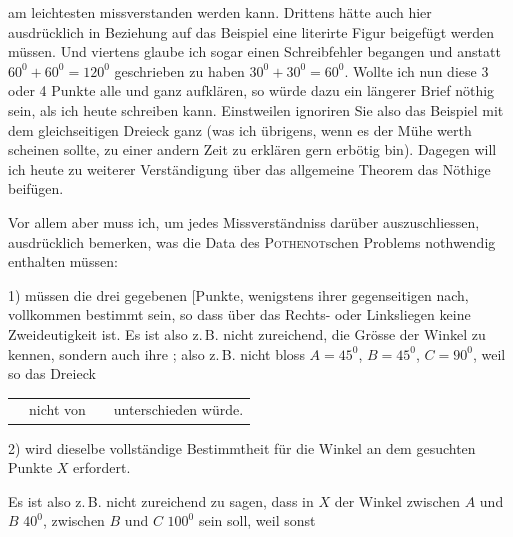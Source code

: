 am leichtesten missverstanden werden kann. Drittens hätte auch hier ausdrücklich
in Beziehung auf das Beispiel eine literirte Figur beigefügt werden müssen. Und
viertens glaube ich sogar einen Schreibfehler begangen und anstatt
$60^0+60^0=120^0$ geschrieben zu haben $30^0+30^0=60^0$. Wollte ich nun diese
3 oder 4 Punkte alle und ganz aufklären, so würde dazu ein längerer Brief
nöthig sein, als ich heute schreiben kann. Einstweilen ignoriren Sie also das
Beispiel mit dem gleichseitigen Dreieck ganz (was ich übrigens, wenn es der
Mühe werth scheinen sollte, zu einer andern Zeit zu erklären gern erbötig
bin). Dagegen will ich heute zu weiterer Verständigung über das allgemeine
Theorem das Nöthige beifügen.

Vor allem aber muss ich, um jedes Missverständniss darüber auszuschliessen,
ausdrücklich bemerken, was die Data des \textsc{Pothenot}schen Problems nothwendig
enthalten müssen:

1) müssen die drei gegebenen [Punkte, wenigstens ihrer gegenseitigen 
nach, vollkommen bestimmt sein, so dass über das Rechts- oder Linksliegen
keine Zweideutigkeit ist. Es ist also z.\,B. nicht zureichend, die Grösse der
Winkel zu kennen, sondern auch ihre ; also z.\,B. nicht bloss $A=45^0$,
$B=45^0$, $C=90^0$, weil so das Dreieck

\begin{center}\begin{tabular}{c@{\quad}c@{\quad}c@{\quad}l}&nicht von&&unterschieden würde.\end{tabular}\end{center}

2) wird dieselbe vollständige Bestimmtheit für die Winkel an dem gesuchten
Punkte $X$ erfordert.

Es ist also z.\,B. nicht zureichend zu sagen, dass in $X$ der Winkel zwischen
$A$ und $B$ $40^0$, zwischen $B$ und $C$ $100^0$ sein soll, weil sonst

\begin{center}\hspace{.8cm}\end{center}
